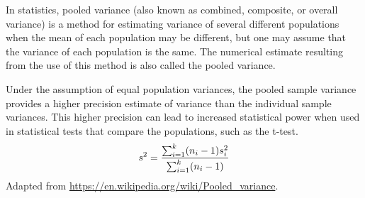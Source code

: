 \begin{*anmerkung}
	In statistics, pooled variance (also known as combined, composite, or overall variance) is a method for estimating variance of several different populations when the mean of each population may be different, but one may assume that the variance of each population is the same. The numerical estimate resulting from the use of this method is also called the pooled variance.
	
	Under the assumption of equal population variances, the pooled sample variance provides a higher precision estimate of variance than the individual sample variances. This higher precision can lead to increased statistical power when used in statistical tests that compare the populations, such as the t-test.
	\begin{align}
		s^2 = \frac{\sum_{i=1}^k (n_i-1)s_i^2}{\sum_{i=1}^k (n_i-1)} \notag
	\end{align}
	Adapted from \url{https://en.wikipedia.org/wiki/Pooled_variance}.
\end{*anmerkung}

